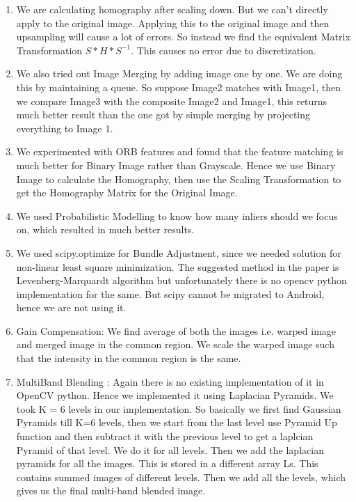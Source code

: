 \documentclass{article}
\begin{document}
\begin{enumerate}

\item We are calculating homography after scaling down. But we can’t directly apply to the original image. Applying this to the original image and then upsampling will cause a lot of errors. So instead we find the equivalent Matrix Transformation $S * H * S^{-1}$. This causes no error due to discretization.

\item We also tried out Image Merging by adding image one by one. We are doing this by maintaining a queue. So suppose Image2 matches with Image1, then we  compare Image3 with the composite Image2 and Image1, this returns much better result than the one got by simple merging by projecting everything to Image 1.

\item We experimented with ORB features and found that the feature matching is much better for Binary Image rather than Grayscale. Hence we use Binary Image to calculate the Homography, then use the Scaling Transformation to get the Homography Matrix for the Original Image.

\item We used Probabilistic Modelling to know how many inliers should we focus on, which resulted in much better results.
 
\item We used scipy.optimize for Bundle Adjustment, since we needed solution for non-linear least square minimization. The suggested method in the paper is Levenberg-Marquardt algorithm but unfortunately there is no opencv python implementation for the same. But scipy cannot be migrated to Android, hence we are not using it.

\item Gain Compensation: We find average of both the images i.e. warped image and merged image in the common region. We scale the warped image such that the intensity in the common region is the same.
 
\item MultiBand Blending : Again there is no existing implementation of it in OpenCV python. Hence we implemented it using Laplacian Pyramids. We took K = 6 levels in our implementation. So basically we first find Gaussian Pyramids till K=6 levels, then we start from the last level use Pyramid Up function and then subtract it with the previous level to get a laplcian Pyramid of that level. We do it for all levels. Then we add the laplacian pyramids for all the images. This is stored in a different array Ls. This contains summed images of different levels. Then we add all the levels, which gives us the final multi-band blended image.
\end{enumerate}
\end{document}
